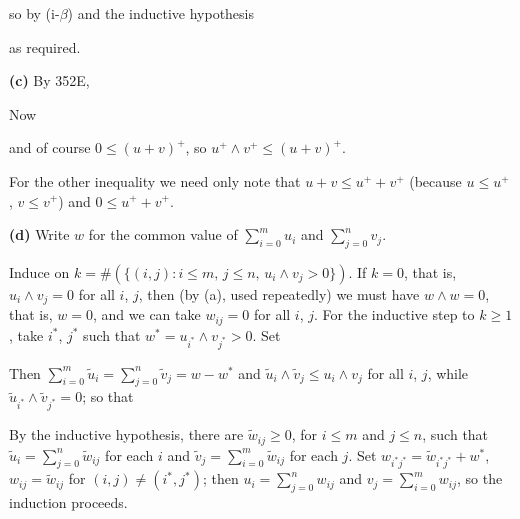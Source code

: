 {
     
\noindent so by (i-$\beta$) and the inductive hypothesis
     
     
\noindent as required.
     
\medskip
     
{\bf (c)} By 352E,
     
     
\noindent Now
     
     
\noindent and of course $0\le(u+v)^+$, so $u^+\wedge v^+\le(u+v)^+$.
     
For the other inequality we need only note that $u+v\le u^++v^+$
(because $u\le u^+$, $v\le v^+$) and $0\le u^++v^+$.
     
\medskip
     
{\bf (d)} Write $w$ for the common value of $\sum_{i=0}^mu_i$ and
$\sum_{j=0}^nv_j$.
     
Induce on
$k=\#(\{(i,j):i\le m,\,j\le n,\,u_i\wedge v_j>0\})$.   If $k=0$, that
is, $u_i\wedge v_j=0$ for all $i$, $j$, then (by (a), used repeatedly)
we must have $w\wedge
w=0$, that is, $w=0$, and we can take $w_{ij}=0$ for all $i$, $j$.   For
the inductive step to $k\ge 1$, take $i^*$, $j^*$ such that
$w^*=u_{i^*}\wedge v_{j^*}>0$.   Set
     
     
     
\noindent Then
$\sum_{i=0}^m\tilde u_i=\sum_{j=0}^n\tilde v_j=w-w^*$ and
$\tilde u_i\wedge\tilde v_j\le u_i\wedge v_j$ for all $i$, $j$,
while $\tilde u_{i^*}\wedge\tilde v_{j^*}=0$;  so that
     
     
\noindent By the inductive hypothesis, there are $\tilde w_{ij}\ge 0$,
for $i\le m$ and $j\le n$, such that
$\tilde u_i=\sum_{j=0}^n\tilde w_{ij}$ for each $i$ and
$\tilde v_j=\sum_{i=0}^m\tilde w_{ij}$ for each
$j$.   Set $w_{i^*j^*}=\tilde w_{i^*j^*}+w^*$,
$w_{ij}=\tilde w_{ij}$ for
$(i,j)\ne(i^*,j^*)$;  then $u_i=\sum_{j=0}^nw_{ij}$ and
$v_j=\sum_{i=0}^mw_{ij}$, so the induction proceeds.
}%
     
